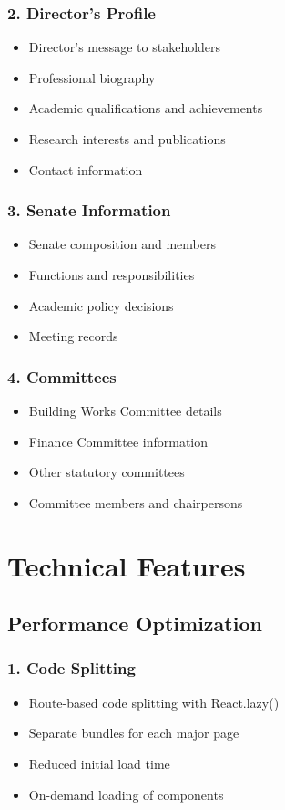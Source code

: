 \documentclass[12pt,a4paper]{report}
\begin{document}
\subsubsection*{2. Director's Profile}
\begin{itemize}
    \item Director's message to stakeholders
    \item Professional biography
    \item Academic qualifications and achievements
    \item Research interests and publications
    \item Contact information
\end{itemize}

\subsubsection*{3. Senate Information}
\begin{itemize}
    \item Senate composition and members
    \item Functions and responsibilities
    \item Academic policy decisions
    \item Meeting records
\end{itemize}

\subsubsection*{4. Committees}
\begin{itemize}
    \item Building Works Committee details
    \item Finance Committee information
    \item Other statutory committees
    \item Committee members and chairpersons
\end{itemize}

\section{Technical Features}

\subsection{Performance Optimization}

\subsubsection*{1. Code Splitting}
\begin{itemize}
    \item Route-based code splitting with React.lazy()
    \item Separate bundles for each major page
    \item Reduced initial load time
    \item On-demand loading of components
\end{itemize}
\end{document}
